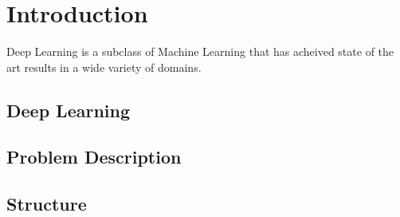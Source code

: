 
\chapter{Introduction}\label{cha:introduction}

Deep Learning is a subclass of Machine Learning that has acheived state of the art results in a wide variety of domains.

\section{Deep Learning}\label{sec:deep_learning}

\section{Problem Description}\label{sec:problem_description}

\section{Structure}\label{sec:structure}